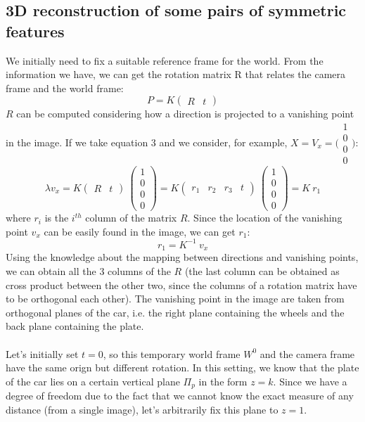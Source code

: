\documentclass{article}
\begin{document}
\subsection{3D reconstruction of some pairs of symmetric features}
We initially need to fix a suitable reference frame for the world. From the information we have, we can get the rotation matrix R that relates the camera frame and the world frame:
$$ P = K \begin{pmatrix} R & t \end{pmatrix} $$
$R$ can be computed considering how a direction is projected to a vanishing point in the image. If we take equation 3 and we consider, for example, $X = V_x = \bigl(\begin{smallmatrix} 1 \\ 0 \\ 0 \\ 0 \end{smallmatrix} \bigr)$:
$$ \lambda v_x = K \begin{pmatrix} R & t \end{pmatrix} \: \begin{pmatrix} 1 \\ 0 \\ 0 \\ 0 \end{pmatrix} =
K \begin{pmatrix} r_1 & r_2 & r_3 & t \end{pmatrix} \: \begin{pmatrix} 1 \\ 0 \\ 0 \\ 0 \end{pmatrix} = 
K \: r_1
$$
where $r_i$ is the $i^{th}$ column of the matrix $R$.
Since the location of the vanishing point $v_x$ can be easily found in the image, we can get $r_1$:
$$ r_1 = K^{-1} \: v_x $$
Using the knowledge about the mapping between directions and vanishing points, we can obtain all the 3 columns of the $R$ (the last column can be obtained as cross product between the other two, since the columns of a rotation matrix have to be orthogonal each other). The vanishing point in the image are taken from orthogonal planes of the car, i.e. the right plane containing the wheels and the back plane containing the plate.
\\
\\
Let's initially set $t=0$, so this temporary world frame $W^0$ and the camera frame have the same orign but different rotation. In this setting, we know that the plate of the car lies on a certain vertical plane $\Pi_p$ in the form $z=k$. Since we have a degree of freedom due to the fact that we cannot know the exact measure of any distance (from a single image), let's arbitrarily fix this plane to $z=1$.
\end{document}
